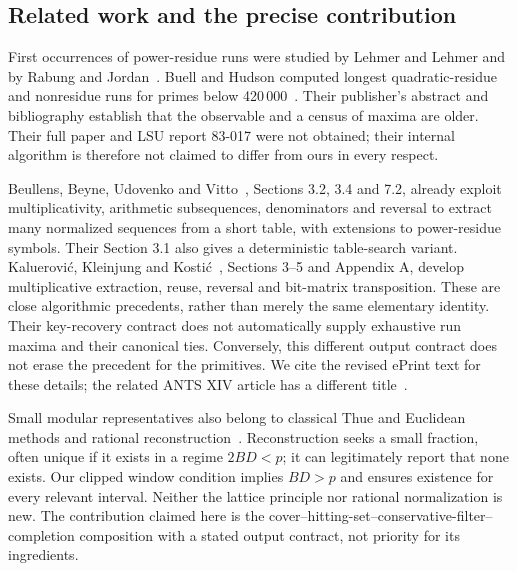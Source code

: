 \documentclass[11pt]{article}
\theoremstyle{definition}\newtheorem{remark}[theorem]{Remark}
\begin{document}
\subsection{Related work and the precise contribution}
First occurrences of power-residue runs were studied by Lehmer and Lehmer
and by Rabung and Jordan~\cite{lehmer,rabungjordan}. Buell and Hudson
computed longest quadratic-residue and nonresidue runs for primes below
420\,000~\cite{buell}. Their publisher's abstract and bibliography establish
that the observable and a census of maxima are older. Their full paper and
LSU report 83-017 were not obtained; their internal algorithm is therefore
not claimed to differ from ours in every respect.

Beullens, Beyne, Udovenko and Vitto~\cite{beullens}, Sections 3.2, 3.4 and
7.2, already exploit multiplicativity, arithmetic subsequences, denominators
and reversal to extract many normalized sequences from a short table, with
extensions to power-residue symbols. Their Section 3.1 also gives a
deterministic table-search variant. Kalu\dj erovi\'c, Kleinjung and
Kosti\'c~\cite{kkk}, Sections 3--5 and Appendix A, develop multiplicative
extraction, reuse, reversal and bit-matrix transposition. These are close
algorithmic precedents, rather than merely the same elementary identity.
Their key-recovery contract does not automatically supply exhaustive run
maxima and their canonical ties. Conversely, this different output contract
does not erase the precedent for the primitives. We cite the revised
ePrint text for these details; the related ANTS XIV article has a different
title~\cite{kkkants}.

Small modular representatives also belong to classical Thue and Euclidean
methods and rational reconstruction~\cite{shoup,wang}. Reconstruction seeks a
small fraction, often unique if it exists in a regime $2BD<p$; it can
legitimately report that none exists. Our clipped window condition implies
$BD>p$ and ensures existence for every relevant interval. Neither the
lattice principle nor rational normalization is new. The contribution
claimed here is the cover--hitting-set--conservative-filter--completion
composition with a stated output contract, not priority for its ingredients.
\end{document}
